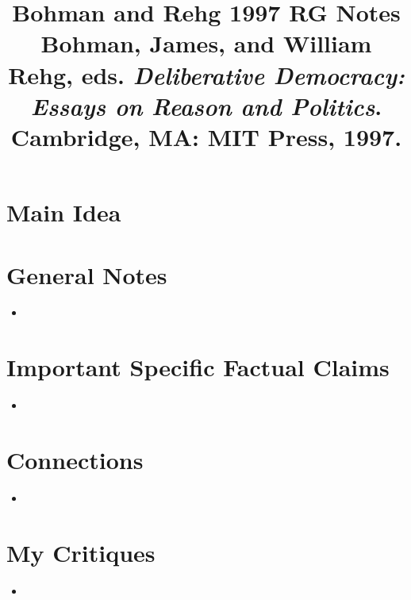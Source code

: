 \documentclass[12pt]{article}
\title{\textbf{Bohman and Rehg 1997 RG Notes}\\
\large Bohman, James, and William Rehg, eds. \textit{Deliberative Democracy: Essays on Reason and Politics}.\\
Cambridge, MA: MIT Press, 1997.}
\author{}
\date{}
\begin{document}
\maketitle

\section{Main Idea}



\section{General Notes}

\begin{itemize}[leftmargin=*, itemsep=4pt]
    \item
\end{itemize}


\section{Important Specific Factual Claims}

\begin{itemize}[leftmargin=*, itemsep=4pt]
    \item
\end{itemize}


\section{Connections}

\begin{itemize}
    \item
\end{itemize}


\section{My Critiques}

\begin{itemize}
    \item
\end{itemize}
\end{document}
